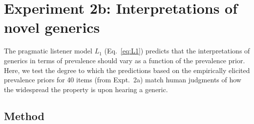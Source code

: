 \documentclass[12pt,letterpaper]{article}
\begin{document}
\section*{Experiment 2b: Interpretations of novel generics}

The pragmatic listener model $L_1$ (Eq.~\ref{eq:L1}) predicts that the interpretations of generics in terms of prevalence should vary as a function of the prevalence prior.
Here, we test the degree to which the predictions based on the empirically elicited prevalence priors for 40 items (from Expt.~2a) match human judgments of how the widespread the property is upon hearing a generic.




\subsection*{Method}
\end{document}
